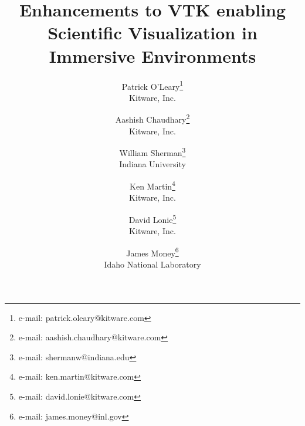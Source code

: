 \title{Enhancements to VTK enabling\\ Scientific Visualization in Immersive Environments}

\author{Patrick O'Leary\thanks{e-mail: patrick.oleary@kitware.com}\\ %
        \scriptsize Kitware, Inc. %
\and Aashish Chaudhary\thanks{e-mail: aashish.chaudhary@kitware.com}\\ %
        \scriptsize Kitware, Inc. %
\and William Sherman\thanks{e-mail: shermanw@indiana.edu}\\ %
        \scriptsize Indiana University %
\and Ken Martin\thanks{e-mail: ken.martin@kitware.com}\\ %
        \scriptsize Kitware, Inc. %
\and David Lonie\thanks{e-mail: david.lonie@kitware.com}\\ %
        \scriptsize Kitware, Inc. %
\and James Money\thanks{e-mail: james.money@inl.gov}\\ %
        \scriptsize Idaho National Laboratory %
        }
